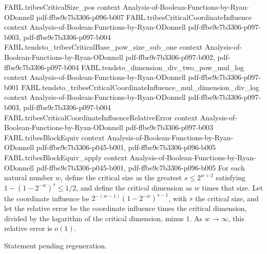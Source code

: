 \begin{theorem}
\proofstep
  {FABL.tribesCriticalSize_pos}
  {context}
  {Analysis-of-Boolean-Functions-by-Ryan-ODonnell}
  {pdf-ffbe9c7b3306-p096-b007}
\proofstep
  {FABL.tribesCriticalCoordinateInfluence}
  {context}
  {Analysis-of-Boolean-Functions-by-Ryan-ODonnell}
  {pdf-ffbe9c7b3306-p097-b003,
    pdf-ffbe9c7b3306-p097-b004}
\proofstep
  {FABL.tendsto_tribesCriticalBase_pow_size_sub_one}
  {context}
  {Analysis-of-Boolean-Functions-by-Ryan-ODonnell}
  {pdf-ffbe9c7b3306-p097-b002,
    pdf-ffbe9c7b3306-p097-b004}
\proofstep
  {FABL.tendsto_dimension_div_two_pow_mul_log}
  {context}
  {Analysis-of-Boolean-Functions-by-Ryan-ODonnell}
  {pdf-ffbe9c7b3306-p097-b001}
\proofstep
  {FABL.tendsto_tribesCriticalCoordinateInfluence_mul_dimension_div_log}
  {context}
  {Analysis-of-Boolean-Functions-by-Ryan-ODonnell}
  {pdf-ffbe9c7b3306-p097-b003,
    pdf-ffbe9c7b3306-p097-b004}
\proofstep
  {FABL.tribesCriticalCoordinateInfluenceRelativeError}
  {context}
  {Analysis-of-Boolean-Functions-by-Ryan-ODonnell}
  {pdf-ffbe9c7b3306-p097-b003}
\proofstep
  {FABL.tribesBlockEquiv}
  {context}
  {Analysis-of-Boolean-Functions-by-Ryan-ODonnell}
  {pdf-ffbe9c7b3306-p045-b001,
    pdf-ffbe9c7b3306-p096-b005}
\proofstep
  {FABL.tribesBlockEquiv_apply}
  {context}
  {Analysis-of-Boolean-Functions-by-Ryan-ODonnell}
  {pdf-ffbe9c7b3306-p045-b001,
    pdf-ffbe9c7b3306-p096-b005}
For each natural number $w$, define the critical size as the greatest $s\le 2^{w+2}$
satisfying $1-(1-2^{-w})^s\le 1/2$, and define the critical dimension as $w$ times that
size. Let the coordinate influence be $2^{-(w-1)}(1-2^{-w})^{s-1}$, with $s$ the
critical size, and let the relative error be the coordinate influence times the critical
dimension, divided by the logarithm of the critical dimension, minus $1$. As
$w\to\infty$, this relative error is $o(1)$.
\end{theorem}

\begin{theorem}
\label{FABL.eventually_booleanInfluence_tribesCritical_eq_log_dimension_div_mul_one_add_error}
\leanok
{}
Statement pending regeneration.
\end{theorem}

